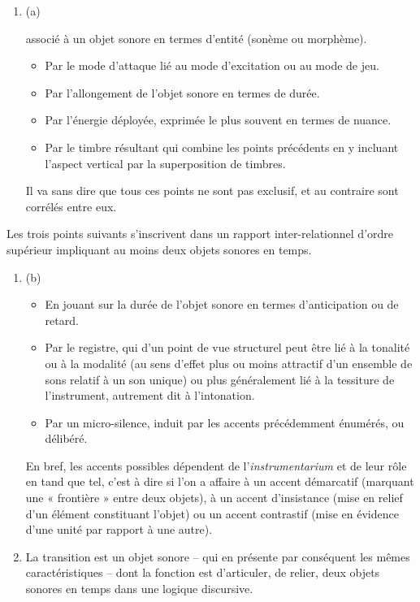 \documentclass{article}
\newcommand{\myuline}[1]{%
  \uline{\phantom{#1}}%
  \llap{{#1}}%
}
\begin{document}
\begin{enumerate}
\item (a) \myuline{Accent} 

associé à un objet sonore en termes d’entité (sonème ou morphème).

\begin{itemize}
\item Par le mode d’attaque lié au mode d’excitation ou au mode de jeu.
\item Par l'allongement de l'objet sonore en termes de durée.
\item Par l’énergie déployée, exprimée le plus souvent en termes de nuance. 
\item Par le timbre résultant qui combine les points précédents en y incluant l'aspect vertical par la superposition de timbres.
\end{itemize}
Il va sans dire que tous ces points ne sont pas exclusif, et au contraire sont corrélés entre eux.
 \end{enumerate}
Les trois points suivants s’inscrivent dans un rapport inter-relationnel d’ordre supérieur impliquant au moins deux objets sonores en temps.
\begin{enumerate}%
\item (b) \myuline{Accent}
\begin{itemize}
\item En jouant sur la durée de l'objet sonore en termes d'anticipation ou de retard.
\item Par le registre, qui d’un point de vue structurel peut être lié à la tonalité ou à la modalité (au sens d’effet plus ou moins attractif d’un ensemble de sons relatif à un son unique) ou plus généralement lié à la tessiture de l'instrument, autrement dit à l’intonation.
\item Par un micro-silence, induit par les accents précédemment énumérés, ou délibéré.
\end{itemize}

En bref, les accents possibles dépendent de l'\textit{instrumentarium} et de leur rôle en tand que tel, c’est à dire si l’on a affaire à un accent démarcatif (marquant une « frontière » entre deux objets), à un accent d’insistance (mise en relief d'un élément constituant l'objet) ou un accent contrastif (mise en évidence d'une unité par rapport à une autre).

\item \myuline{Transition}

La transition est un objet sonore -- qui en présente par conséquent les mêmes caractéristiques --  dont la fonction est d'articuler, de relier, deux objets sonores en temps dans une logique discursive.

 \end{enumerate}
\end{document}
